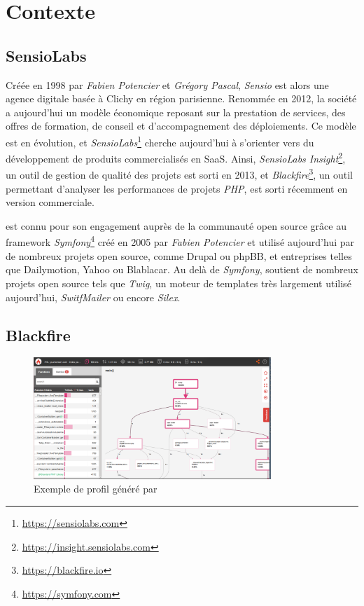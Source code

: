 \setcounter{part}{1}

\chapter{Contexte}
	\setcounter{chapter}{1}
	\section{SensioLabs}
Créée en 1998 par \emph{Fabien Potencier} et \emph{Grégory Pascal}, \emph{Sensio} est alors une agence digitale basée à Clichy en région parisienne. Renommée \SensioLabs en 2012, la société a aujourd'hui un modèle économique reposant sur la prestation de services, des offres de formation, de conseil et d'accompagnement des déploiements. Ce modèle est en évolution, et \emph{SensioLabs}\footnote{\url{https://sensiolabs.com}} cherche aujourd'hui à s'orienter vers du développement de produits commercialisés en \gls{SaaS}. Ainsi, \emph{SensioLabs Insight}\footnote{\url{https://insight.sensiolabs.com}}, un outil de gestion de qualité des projets \PHP est sorti en 2013, et \emph{Blackfire}\footnote{\url{https://blackfire.io}}, un outil permettant d'analyser les performances de projets \emph{PHP}, est sorti récemment en version commerciale.

\SensioLabs est connu pour son engagement auprès de la communauté open source \PHP grâce au framework \emph{Symfony}\footnote{\url{https://symfony.com}} créé en 2005 par \emph{Fabien Potencier} et utilisé aujourd'hui par de nombreux projets open source, comme Drupal ou phpBB, et entreprises telles que Dailymotion, Yahoo ou Blablacar. Au delà de \emph{Symfony}, \SensioLabs soutient de nombreux projets open source \PHP tels que \emph{Twig}, un moteur de templates très largement utilisé aujourd'hui, \emph{SwitfMailer} ou encore \emph{Silex}.

\clearpage

	\section{Blackfire}

\begin{figure}[!h]
\begin{center}
    \includegraphics[width=0.8\textwidth]{images/blackfire-exemple}
  \caption{Exemple de profil généré par \Blackfire}
  \centering
\end{center}
\end{figure}

